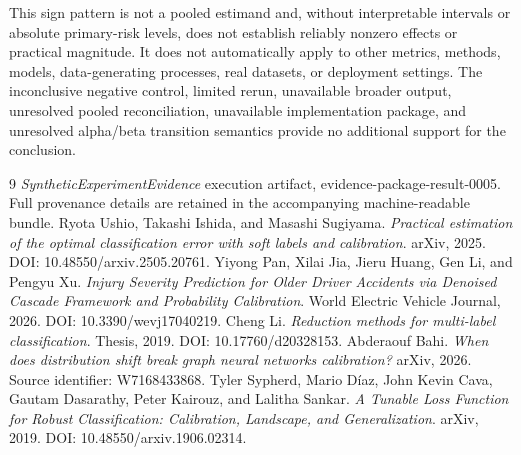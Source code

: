 \documentclass{article}
\begin{document}
This sign pattern is not a pooled estimand and, without interpretable intervals or absolute primary-risk levels, does not establish reliably nonzero effects or practical magnitude. It does not automatically apply to other metrics, methods, models, data-generating processes, real datasets, or deployment settings. The inconclusive negative control, limited rerun, unavailable broader output, unresolved pooled reconciliation, unavailable implementation package, and unresolved alpha/beta transition semantics provide no additional support for the conclusion.

\begin{thebibliography}{9}
 \emph{SyntheticExperimentEvidence} execution artifact, evidence-package-result-0005. Full provenance details are retained in the accompanying machine-readable bundle.
 Ryota Ushio, Takashi Ishida, and Masashi Sugiyama. \emph{Practical estimation of the optimal classification error with soft labels and calibration}. arXiv, 2025. DOI: 10.48550/arxiv.2505.20761.
 Yiyong Pan, Xilai Jia, Jieru Huang, Gen Li, and Pengyu Xu. \emph{Injury Severity Prediction for Older Driver Accidents via Denoised Cascade Framework and Probability Calibration}. World Electric Vehicle Journal, 2026. DOI: 10.3390/wevj17040219.
 Cheng Li. \emph{Reduction methods for multi-label classification}. Thesis, 2019. DOI: 10.17760/d20328153.
 Abderaouf Bahi. \emph{When does distribution shift break graph neural networks calibration?} arXiv, 2026. Source identifier: W7168433868.
 Tyler Sypherd, Mario D{\'i}az, John Kevin Cava, Gautam Dasarathy, Peter Kairouz, and Lalitha Sankar. \emph{A Tunable Loss Function for Robust Classification: Calibration, Landscape, and Generalization}. arXiv, 2019. DOI: 10.48550/arxiv.1906.02314.
\end{thebibliography}
\end{document}
